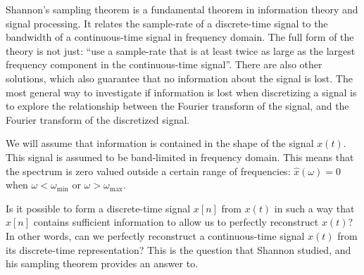 Shannon's sampling theorem is a fundamental theorem in information theory and signal processing. It relates the sample-rate of a discrete-time signal to the bandwidth of a continuous-time signal in frequency domain. The full form of the theory is not just: ``use a sample-rate that is at least twice as large as the largest frequency component in the continuous-time signal''. There are also other solutions, which also guarantee that no information about the signal is lost. The most general way to investigate if information is lost when discretizing a signal is to explore the relationship between the Fourier transform of the signal, and the Fourier transform of the discretized signal.

We will assume that information is contained in the shape of the signal $x(t)$. This signal is assumed to be band-limited in frequency domain. This means that the spectrum is zero valued outside a certain range of frequencies: $\hat{x}(\omega) = 0$ when $\omega < \omega_{\mathrm{min}}$ or $\omega > \omega_{\mathrm{max}}$.

Is it possible to form a discrete-time signal $x[n]$ from $x(t)$ in such a way that $x[n]$ contains sufficient information to allow us to perfectly reconstruct $x(t)$? In other words, can we perfectly reconstruct a continuous-time signal $x(t)$ from its discrete-time representation? This is the question that Shannon studied, and his sampling theorem provides an answer to.


